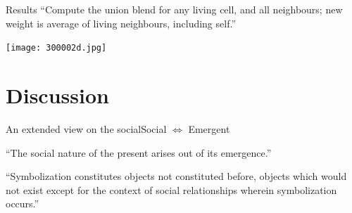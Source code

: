 \begin{frame}{Results}{}
{\footnotesize ``Compute the union blend for any living cell, and all neighbours; new weight is average of living neighbours, including self.''}
\begin{center}
\texttt{[image: 300002d.jpg]}
\end{center}
\end{frame}

\part{Discussion}
\frame{\partpage}

\begin{frame}{An extended view on the social}{Social $\Leftrightarrow$ Emergent}
{\small ``The social nature of the present arises out of its emergence.''

\medskip



``Symbolization constitutes objects not constituted before, objects which would not exist except for the context of social relationships wherein symbolization occurs.''
} \qquad\qquad {}
\end{frame}

